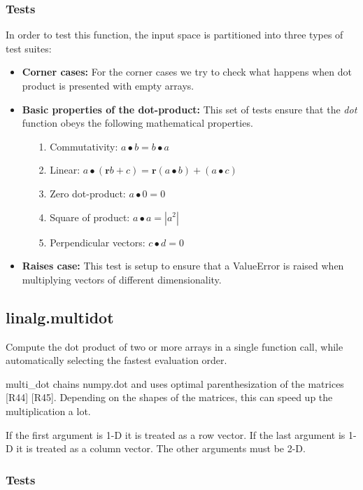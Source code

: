 \documentclass[a4paper,11pt]{article}
\begin{document}
\subsubsection{Tests}
In order to test this function, the input space is partitioned into three types of test suites:

\begin{itemize}
	\item \textbf{Corner cases:} For the corner cases we try to check what happens when dot product is presented with empty arrays.
	
	\item \textbf{Basic properties of the dot-product:} This set of tests ensure that the \textit{dot} function obeys the following mathematical properties.
	\begin{itemize}
		\item[1.] Commutativity: $ a \bullet b = b \bullet a $ 
		\item[2.] Linear: $ a \bullet (\textbf{r}b + c) = \textbf{r}(a \bullet b) + (a \bullet c) $
		\item[3.] Zero dot-product: $ a \bullet 0 = 0 $
		\item[4.] Square of product: $ a \bullet a = | a^2 |$
		\item[5.] Perpendicular vectors: $ c \bullet d = 0$
	\end{itemize}
	
	\item \textbf{Raises case:} This test is setup to ensure that a ValueError is raised when multiplying vectors of different dimensionality.
\end{itemize}

\subsection{linalg.multidot}
Compute the dot product of two or more arrays in a single function call, while automatically selecting the fastest evaluation order.

multi\_dot chains numpy.dot and uses optimal parenthesization of the matrices [R44] [R45]. Depending on the shapes of the matrices, this can speed up the multiplication a lot.

If the first argument is 1-D it is treated as a row vector. If the last argument is 1-D it is treated as a column vector. The other arguments must be 2-D.

\subsubsection{Tests}
\end{document}
